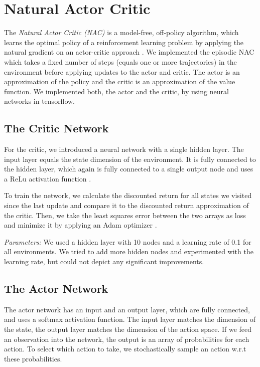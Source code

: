 
\section{Natural Actor Critic}
\label{sec:nac}

The \textit{Natural Actor Critic (NAC)} \citep{peters2008natural} is a model-free, off-policy algorithm, which learns the optimal policy of a reinforcement learning problem by applying the natural gradient \citep{amari1998natural} on an actor-critic approach \citep{sutton1998introduction}. We implemented the episodic NAC \citep{peters2008natural} which takes a fixed number of steps (equals one or more trajectories) in the environment before applying updates to the actor and critic. The actor is an approximation of the policy and the critic is an approximation of the value function. We implemented both, the actor and the critic, by using neural networks in tensorflow.

\subsection{The Critic Network}
For the critic, we introduced a neural network with a single hidden layer. The input layer equals the state dimension of the environment. It is fully connected to the hidden layer, which again is fully connected to a single output node and uses a ReLu activation function \citep{glorot2011deep}. 

To train the network, we calculate the discounted return for all states we visited since the last update and compare it to the discounted return approximation of the critic. Then, we take the least squares error between the two arrays as loss and minimize it by applying an Adam optimizer \citep{kingma2014adam}.

\textit{Parameters:} We used a hidden layer with 10 nodes and a learning rate of 0.1 for all environments. We tried to add more hidden nodes and experimented with the learning rate, but could not depict any significant improvements.

\subsection{The Actor Network}

The actor network has an input and an output layer, which are fully connected, and uses a softmax activation function. The input layer matches the dimension of the state, the output layer matches the dimension of the action space. If we feed an observation into the network, the output is an array of probabilities for each action. To select which action to take, we stochastically sample an action w.r.t these probabilities.

